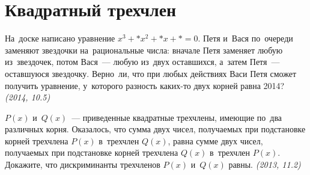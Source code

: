 
\section*{Квадратный трехчлен}


\begin{problems}




\item
На~доске написано уравнение $x^3 + \ast x^2 + \ast x + \ast = 0$.
Петя и~Вася по~очереди заменяют звездочки на~рациональные числа:
вначале Петя заменяет любую из~звездочек, потом Вася~--- любую из~двух
оставшихся, а~затем Петя~--- оставшуюся звездочку.
Верно~ли, что при любых действиях Васи Петя сможет получить уравнение,
у~которого разность каких-то двух корней равна 2014?
\emph{(2014, 10.5)}

\item
$P(x)$ и~$Q(x)$~--- приведенные квадратные трехчлены, имеющие по~два различных
корня.
Оказалось, что сумма двух чисел, получаемых при подстановке корней
трехчлена $P(x)$ в~трехчлен $Q(x)$, равна сумме двух чисел, получаемых при
подстановке корней трехчлена $Q(x)$ в~трехчлен $P(x)$.
Докажите, что дискриминанты трехчленов $P(x)$ и~$Q(x)$ равны.
\emph{(2013, 11.2)}



\end{problems}
